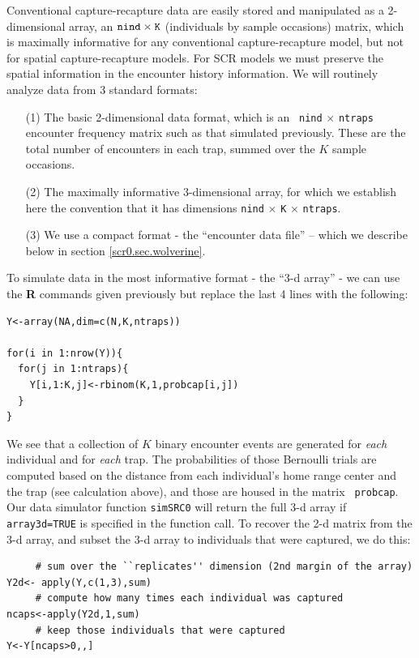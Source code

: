 Conventional capture-recapture data are easily stored and manipulated
as a 2-dimensional array, an $\mbox{\tt nind} \times \mbox{\tt
  K}$ (individuals by sample occasions) matrix, which is maximally informative for any
conventional capture-recapture model, but not for spatial
capture-recapture models.  For SCR models we must preserve the spatial
information in the encounter history information. We will routinely
analyze data from 3 standard formats:
\begin{itemize}
\item[(1)] The basic 2-dimensional data format, which is an \mbox{\tt
    nind} $\times$ \mbox{\tt ntraps} encounter frequency matrix such
  as that simulated previously. These are the total number of encounters in each
  trap, summed over the $K$ sample occasions.
\item[(2)] The maximally informative 3-dimensional array, for which we
  establish here the convention that it has dimensions \mbox{\tt nind}
  $\times$ \mbox{\tt K} $\times$ \mbox{\tt ntraps}.
\item[(3)] We use a compact format - the ``encounter data file'' -- which
  we describe below in section \ref{scr0.sec.wolverine}.
\end{itemize}
To simulate data in the most informative format - the ``3-d array'' -
we can use the {\bf R} commands given previously but replace the last
4 lines with the following:
{\small
\begin{verbatim}
Y<-array(NA,dim=c(N,K,ntraps))

for(i in 1:nrow(Y)){
  for(j in 1:ntraps){
    Y[i,1:K,j]<-rbinom(K,1,probcap[i,j])
  }
}
\end{verbatim}
}

We see that a collection of $K$ binary encounter events are
generated for {\it each} individual and for {\it each} trap.  The
probabilities of those Bernoulli trials are computed based on the
distance from each individual's home range center and the trap (see
calculation above), and those are housed in the matrix \mbox{\tt
  probcap}. Our data simulator function \mbox{\tt simSRC0} will
return the full 3-d array if \mbox{\tt array3d=TRUE} is specified in
the function call.  To recover the 2-d matrix from the 3-d array, and
subset the 3-d array to individuals that were captured, we do this:
{\small
\begin{verbatim}
     # sum over the ``replicates'' dimension (2nd margin of the array)
Y2d<- apply(Y,c(1,3),sum)
     # compute how many times each individual was captured
ncaps<-apply(Y2d,1,sum)
     # keep those individuals that were captured
Y<-Y[ncaps>0,,]
\end{verbatim}
}

